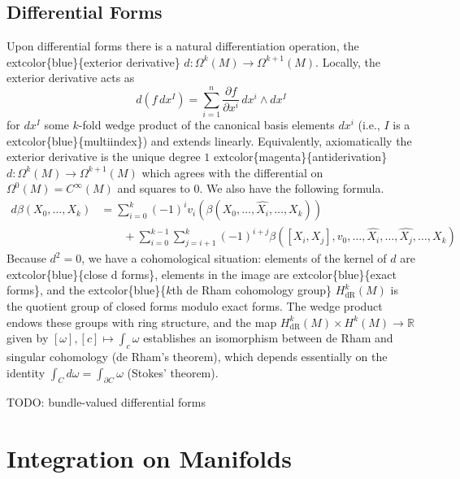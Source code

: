 \documentclass[
]{book}
\begin{document}
\hypertarget{differential-forms}{%
\subsection{Differential Forms}\label{differential-forms}}

Upon differential forms there is a natural differentiation operation, the extcolor\{blue\}\{exterior derivative\} \(d : \Omega^k(M) \to \Omega^{k+1}(M)\). Locally, the exterior derivative acts as
\begin{equation} 
    d(f \, dx^I) = \sum_{i=1}^n \frac{\partial f}{\partial x^i} \, dx^i \wedge dx^I 
\end{equation}
for \(dx^I\) some \(k\)-fold wedge product of the canonical basis elements \(dx^i\) (i.e., \(I\) is a extcolor\{blue\}\{multiindex\}) and extends linearly.
Equivalently, axiomatically the exterior derivative is the unique degree \(1\) extcolor\{magenta\}\{antiderivation\} \(d : \Omega^k(M) \to \Omega^{k+1}(M)\) which agrees with the differential on \(\Omega^0(M) = C^\infty(M)\) and squares to \(0\).
We also have the following formula.
\begin{equation} 
    \begin{aligned} 
        d\beta(X_0, \dots, X_k)  
        &= \sum_{i=0}^k (-1)^i v_i(\beta(X_0, \dots, \hat{X_i}, \dots, X_k)) \\ 
        &\qquad + \sum_{i=0}^{k-1} \sum_{j = i+1}^k (-1)^{i+j} \beta([X_i, X_j], v_0, \dots, \hat{X_i}, \dots, \hat{X_j}, \dots, X_k) 
    \end{aligned} 
\end{equation}
Because \(d^2 = 0\), we have a cohomological situation: elements of the kernel of \(d\) are extcolor\{blue\}\{close d forms\}, elements in the image are extcolor\{blue\}\{exact forms\}, and the extcolor\{blue\}\{\(k\)th de Rham cohomology group\} \(H^k_{\text{dR}}(M)\) is the quotient group of closed forms modulo exact forms.
The wedge product endows these groups with ring structure, and the map \(H^k_{\text{dR}}(M) \times H^k(M) \to \mathbb{R}\) given by \([\omega], [c] \mapsto \int_c \omega\) establishes an isomorphism between de Rham and singular cohomology (de Rham's theorem), which depends essentially on the identity \(\int_C d\omega = \int_{\partial C} \omega\) (Stokes' theorem).

TODO: bundle-valued differential forms

\hypertarget{integration-on-manifolds}{%
\section{Integration on Manifolds}\label{integration-on-manifolds}}
\end{document}
